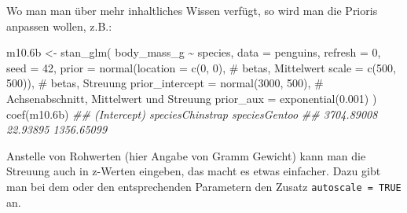 \documentclass[
  a4paper,
  DIV=11]{scrreprt}
\newenvironment{Shaded}{\begin{snugshade}}{\end{snugshade}}
\newcommand{\AttributeTok}[1]{\textcolor[rgb]{0.40,0.45,0.13}{#1}}
\newcommand{\CommentTok}[1]{\textcolor[rgb]{0.37,0.37,0.37}{#1}}
\newcommand{\DecValTok}[1]{\textcolor[rgb]{0.68,0.00,0.00}{#1}}
\newcommand{\DocumentationTok}[1]{\textcolor[rgb]{0.37,0.37,0.37}{\textit{#1}}}
\newcommand{\FloatTok}[1]{\textcolor[rgb]{0.68,0.00,0.00}{#1}}
\newcommand{\FunctionTok}[1]{\textcolor[rgb]{0.28,0.35,0.67}{#1}}
\newcommand{\NormalTok}[1]{\textcolor[rgb]{0.00,0.23,0.31}{#1}}
\newcommand{\OtherTok}[1]{\textcolor[rgb]{0.00,0.23,0.31}{#1}}
\newcommand{\SpecialCharTok}[1]{\textcolor[rgb]{0.37,0.37,0.37}{#1}}
\theoremstyle{definition}
\theoremstyle{remark}
\begin{document}
Wo man man über mehr inhaltliches Wissen verfügt, so wird man die
Prioris anpassen wollen, z.B.:

\begin{Shaded}
\begin{Highlighting}[]
\NormalTok{m10}\FloatTok{.6}\NormalTok{b }\OtherTok{\textless{}{-}} \FunctionTok{stan\_glm}\NormalTok{(}
\NormalTok{  body\_mass\_g }\SpecialCharTok{\textasciitilde{}}\NormalTok{ species, }
  \AttributeTok{data =}\NormalTok{ penguins, }
  \AttributeTok{refresh =} \DecValTok{0}\NormalTok{,}
  \AttributeTok{seed =} \DecValTok{42}\NormalTok{,}
  \AttributeTok{prior =} \FunctionTok{normal}\NormalTok{(}\AttributeTok{location =} \FunctionTok{c}\NormalTok{(}\DecValTok{0}\NormalTok{, }\DecValTok{0}\NormalTok{),  }\CommentTok{\# betas, Mittelwert}
                 \AttributeTok{scale =} \FunctionTok{c}\NormalTok{(}\DecValTok{500}\NormalTok{, }\DecValTok{500}\NormalTok{)),  }\CommentTok{\# betas, Streuung}
  \AttributeTok{prior\_intercept =} \FunctionTok{normal}\NormalTok{(}\DecValTok{3000}\NormalTok{, }\DecValTok{500}\NormalTok{),  }\CommentTok{\# Achsenabschnitt, Mittelwert und Streuung}
  \AttributeTok{prior\_aux =} \FunctionTok{exponential}\NormalTok{(}\FloatTok{0.001}\NormalTok{)}
\NormalTok{)}
\FunctionTok{coef}\NormalTok{(m10}\FloatTok{.6}\NormalTok{b)}
\DocumentationTok{\#\#      (Intercept) speciesChinstrap    speciesGentoo }
\DocumentationTok{\#\#       3704.89008         22.93895       1356.65099}
\end{Highlighting}
\end{Shaded}

Anstelle von Rohwerten (hier Angabe von Gramm Gewicht) kann man die
Streuung auch in z-Werten eingeben, das macht es etwas einfacher. Dazu
gibt man bei dem oder den entsprechenden Parametern den Zusatz
\texttt{autoscale\ =\ TRUE} an.
\end{document}
